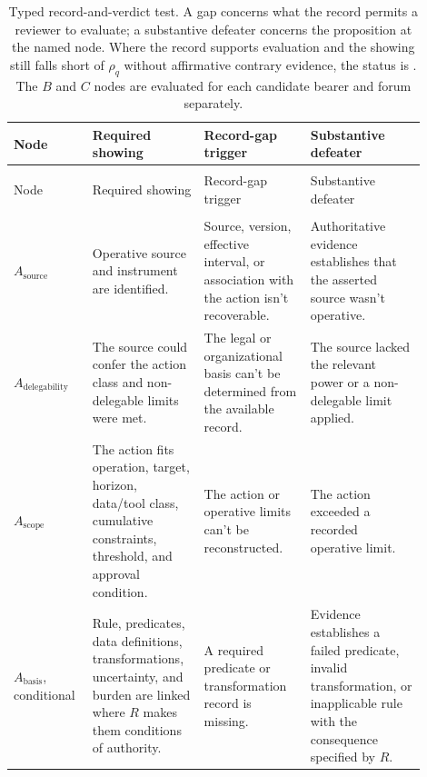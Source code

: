 \begingroup
\scriptsize
\setlength{\tabcolsep}{4pt}
\renewcommand{\arraystretch}{0.92}
\begin{longtable}{>{\raggedright\arraybackslash}p{0.15\linewidth}%
                >{\raggedright\arraybackslash}p{0.25\linewidth}%
                >{\raggedright\arraybackslash}p{0.24\linewidth}%
                >{\raggedright\arraybackslash}p{0.26\linewidth}}
\caption{Typed record-and-verdict test. A gap concerns what the record permits a reviewer to evaluate; a substantive defeater concerns the proposition at the named node. Where the record supports evaluation and the showing still falls short of \(\rho_q\) without affirmative contrary evidence, the status is . The \(B\) and \(C\) nodes are evaluated for each candidate bearer and forum separately.}
\label{tab:sufficiency-test}\\
\toprule
Node & Required showing & Record-gap trigger & Substantive defeater \\
\midrule
\endfirsthead
\multicolumn{4}{c}{\tablename\ \thetable\ continued}\\
\toprule
Node & Required showing & Record-gap trigger & Substantive defeater \\
\midrule
\endhead
\midrule
\multicolumn{4}{r}{Continued on next page}\\
\endfoot
\bottomrule
\endlastfoot
\(A_{\mathrm{source}}\) & Operative source and instrument are identified. & Source, version, effective interval, or association with the action isn't recoverable. & Authoritative evidence establishes that the asserted source wasn't operative. \\
\(A_{\mathrm{delegability}}\) & The source could confer the action class and non-delegable limits were met. & The legal or organizational basis can't be determined from the available record. & The source lacked the relevant power or a non-delegable limit applied. \\
\(A_{\mathrm{scope}}\) & The action fits operation, target, horizon, data/tool class, cumulative constraints, threshold, and approval condition. & The action or operative limits can't be reconstructed. & The action exceeded a recorded operative limit. \\
\(A_{\mathrm{basis}}\), conditional & Rule, predicates, data definitions, transformations, uncertainty, and burden are linked where \(R\) makes them conditions of authority. & A required predicate or transformation record is missing. & Evidence establishes a failed predicate, invalid transformation, or inapplicable rule with the consequence specified by \(R\). \\

\end{longtable}

